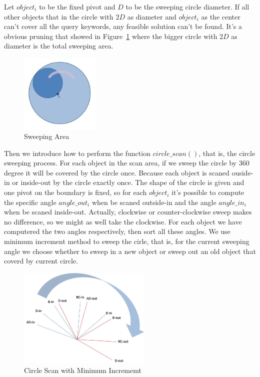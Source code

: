 \documentclass{sig-alternate}
\begin{document}
Let $object_i$ to be the fixed pivot and $D$ to be the sweeping circle diameter.
If all other objects that in the circle with $2D$ as diameter and $object_i$ as
the center can't cover all the query keywords, any feasible solution can't
be found. It's a obvious pruning that showed in Figure~\ref{fig:5} where the
bigger circle with $2D$ as diameter is the total sweeping area.

\begin{figure}\label{fig:5}
\begin{center}
\includegraphics[width=1.5in]{figure/fig5}
\caption{Sweeping Area}
\end{center}
\end{figure}

Then we introduce how to perform the function $circle\_scan()$, that is, the circle
sweeping process. For each object in the scan area, if we sweep the circle by $360$
degree it will be covered by the circle once. Because each object is scaned
ouside-in or inside-out by the circle exactly once. The shape of the circle is
given and one pivot on the boundary is fixed, so for each $object_i$ it's possible
to compute the specific angle $angle\_out_i$ when be scaned outside-in and the
angle $angle\_in_i$ when be scaned inside-out. Actually, clockwise or
counter-clockwise sweep makes no difference, so we might as well take the clockwise.
For each object we have computered the two angles respectively, then sort all these angles. 
We use minimum increment method to sweep the cirle, that is, for the current sweeping
angle  we choose whether to sweep in a new object or sweep out an old
object that coverd by current circle.

\begin{figure}\label{fig:7}
\begin{center}
\includegraphics[width=2.5in]{figure/fig7}
\caption{Circle Scan with Minimum Incrememt}
\end{center}
\end{figure}
\end{document}

